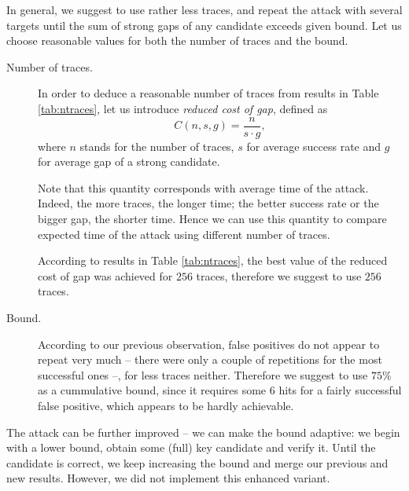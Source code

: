 In general, we suggest to use rather less traces, and repeat the attack with several targets until the sum of strong gaps of any candidate exceeds given bound. Let us choose reasonable values for both the number of traces and the bound.
\begin{description}
	\item[Number of traces.]
		In order to deduce a reasonable number of traces from results in Table \ref{tab:ntraces}, let us introduce {\em reduced cost of gap}, defined as
		\begin{equation}
		\label{eq:redcost}
			C(n, s, g) = \frac{n}{s\cdot g} ,
		\end{equation}
		where $n$ stands for the number of traces, $s$ for average success rate and $g$ for average gap of a strong candidate.
		
		Note that this quantity corresponds with average time of the attack. Indeed, the more traces, the longer time; the better success rate or the bigger gap, the shorter time. Hence we can use this quantity to compare expected time of the attack using different number of traces.
		
		According to results in Table \ref{tab:ntraces}, the best value of the reduced cost of gap was achieved for $256$ traces, therefore we suggest to use $256$ traces.
	\item[Bound.]
		According to our previous observation, false positives do not appear to repeat very much -- there were only a couple of repetitions for the most successful ones --, for less traces neither. Therefore we suggest to use $75\%$ as a cummulative bound, since it requires some $6$ hits for a fairly successful false positive, which appears to be hardly achievable.
\end{description}

\begin{remark}
\label{rem:attimpr}   %
	The attack can be further improved -- we can make the bound adaptive: we begin with a lower bound, obtain some (full) key candidate and verify it. Until the candidate is correct, we keep increasing the bound and merge our previous and new results. However, we did not implement this enhanced variant.
\end{remark}

